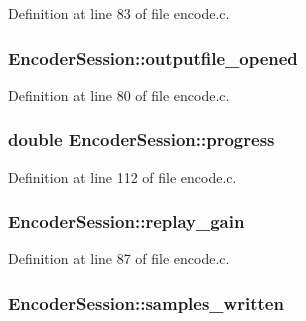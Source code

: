 Definition at line 83 of file encode.\+c.

\subsubsection[{\texorpdfstring{outputfile\+\_\+opened}{outputfile_opened}}]{ Encoder\+Session\+::outputfile\+\_\+opened}\hypertarget{struct_encoder_session_a7c43a03b8e04d7d53d536d7d1f5fa62d}{}\label{struct_encoder_session_a7c43a03b8e04d7d53d536d7d1f5fa62d}


Definition at line 80 of file encode.\+c.

\subsubsection[{\texorpdfstring{progress}{progress}}]{\setlength{\rightskip}{0pt plus 5cm}double Encoder\+Session\+::progress}\hypertarget{struct_encoder_session_a3d10732b638e531c3aae439b5309c9f6}{}\label{struct_encoder_session_a3d10732b638e531c3aae439b5309c9f6}


Definition at line 112 of file encode.\+c.

\subsubsection[{\texorpdfstring{replay\+\_\+gain}{replay_gain}}]{ Encoder\+Session\+::replay\+\_\+gain}\hypertarget{struct_encoder_session_adb426b9bf02b8abf46c43217bd4db853}{}\label{struct_encoder_session_adb426b9bf02b8abf46c43217bd4db853}


Definition at line 87 of file encode.\+c.

\subsubsection[{\texorpdfstring{samples\+\_\+written}{samples_written}}]{ Encoder\+Session\+::samples\+\_\+written}\hypertarget{struct_encoder_session_af4860ab7aee0bd2845d45f26d8f34a63}{}\label{struct_encoder_session_af4860ab7aee0bd2845d45f26d8f34a63}


